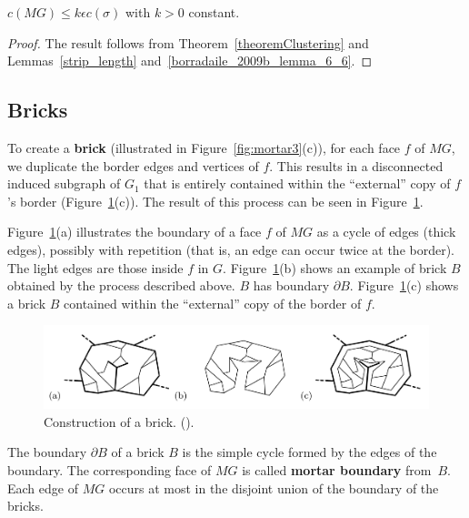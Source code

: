 \begin{flemma} \label{length_mg}
     \(c(MG) \leq k \epsilon c(\sigma)\) with \(k > 0\) constant.
\end{flemma}
\begin{proof}
    The result follows from Theorem~\ref{theoremClustering} and Lemmas~\ref{strip_length} and~\ref{borradaile_2009b_lemma_6_6}.
\end{proof}

\subsection{Bricks}

To create a \textbf{brick} (illustrated in  Figure~\ref{fig:mortar3}(c)), for each face \(f\) of \(MG\), we duplicate the border edges and vertices of \(f\). This results in a disconnected induced subgraph of \(G_1\) that is entirely contained within the ``external'' copy of \(f\)'s border (Figure~\ref{fig:mortar4}(c)). The result of this process can be seen in Figure~\ref{fig:mortar4}.

Figure~\ref{fig:mortar4}(a) illustrates the boundary of a face \(f\) of \(MG\) as a cycle of edges (thick edges), possibly with repetition (that is, an edge can occur twice at the border). The light edges are those inside \(f\) in \(G\). Figure~\ref{fig:mortar4}(b) shows an example of brick \(B\) obtained by the process described above. \(B\) has boundary \(\partial B\). Figure~\ref{fig:mortar4}(c) shows a brick \(B\) contained within the ``external'' copy of the border of \(f\).

\begin{figure}[h]
    \centering
    \includegraphics[scale=0.45]{imgs/mortar4.png}
    \caption{Construction of a brick. (\cite{Borradaile2009b}).}
    \label{fig:mortar4}
\end{figure}

The boundary \(\partial B\) of a brick \(B\) is the simple cycle formed by the edges of the boundary. The corresponding face of \(MG\) is called \textbf{mortar boundary} from~\(B\). Each edge of \(MG\) occurs at most in the disjoint union of the boundary of the bricks.


